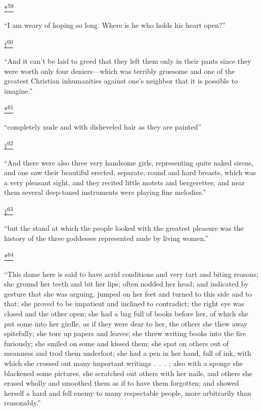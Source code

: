 \protect\hypertarget{23_NOTES.xhtmlux5cux23id_2836}{\protect\hyperlink{21_Chapter_Thirteen__IMAGE_AND_WORD.xhtmlux5cux23id_2835}{*\textsuperscript{59}}}
``I am weary of hoping so long. Where is he who holds his heart open?''

\protect\hypertarget{23_NOTES.xhtmlux5cux23id_2834}{\protect\hyperlink{21_Chapter_Thirteen__IMAGE_AND_WORD.xhtmlux5cux23id_2833}{†\textsuperscript{60}}}
``And it can't be laid to greed that they left them only in their pants
since they were worth only four deniers---which was terribly gruesome
and one of the greatest Christian inhumanities against one's neighbor
that it is possible to imagine.''

\protect\hypertarget{23_NOTES.xhtmlux5cux23id_2832}{\protect\hyperlink{21_Chapter_Thirteen__IMAGE_AND_WORD.xhtmlux5cux23id_2831}{*\textsuperscript{61}}}
``completely nude and with disheveled hair as they are painted''

\protect\hypertarget{23_NOTES.xhtmlux5cux23id_2830}{\protect\hyperlink{21_Chapter_Thirteen__IMAGE_AND_WORD.xhtmlux5cux23id_2829}{†\textsuperscript{62}}}
``And there were also three very handsome girls, representing quite
naked sirens, and one saw their beautiful erected, separate, round and
hard breasts, which was a very pleasant sight, and they recited little
motets and bergerettes; and near them several deep-toned instruments
were playing fine melodies.''

\protect\hypertarget{23_NOTES.xhtmlux5cux23id_2828}{\protect\hyperlink{21_Chapter_Thirteen__IMAGE_AND_WORD.xhtmlux5cux23id_2827}{‡\textsuperscript{63}}}
``but the stand at which the people looked with the greatest pleasure
was the history of the three goddesses represented nude by living
women.''

\protect\hypertarget{23_NOTES.xhtmlux5cux23id_2826}{\protect\hyperlink{21_Chapter_Thirteen__IMAGE_AND_WORD.xhtmlux5cux23id_2825}{*\textsuperscript{64}}}
``This dame here is said to have acrid conditions and very tart and
biting reasons; she ground her teeth and bit her lips; often nodded her
head; and indicated by gesture that she was arguing, jumped on her feet
and turned to this side and to that; she proved to be impatient and
inclined to contradict; the right eye was closed and the other open; she
had a bag full of books before her, of which she put some into her
girdle, as if they were dear to her, the others she thew away
spitefully; she tore up papers and leaves; she threw writing books into
the fire furiously; she smiled on some and kissed them; she spat on
others out of meanness and trod them underfoot; she had a pen in her
hand, full of ink, with which she crossed out many important writings
.~.~. ; also with a sponge she blackened some pictures, she scratched
out others with her nails, and others she erased wholly and smoothed
them as if to have them forgotten; and showed herself a hard and fell
enemy to many respectable people, more arbitrarily than reasonably.''

